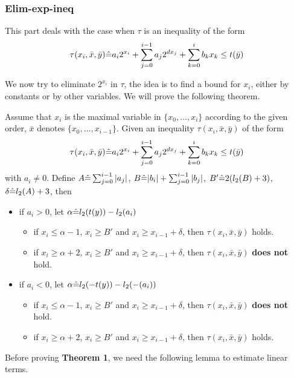 {\subsubsection{Elim-exp-ineq}

This part deals with the case when $\tau$ is an inequality of the form 
$$\tau(x_i,\bar{x},\bar{y}) \hat{=}  a_i 2^{x_i}+\sum_{j=0}^{i-1} a_j2^{d x_j} + \sum_{k=0}^{i}b_k x_k \le t(\bar{y})$$

We now try to eliminate $2^{x_i}$ in $\tau$, the idea is to find a bound for $x_i$, 
either by constants or by other variables.
We will prove the following theorem.

\begin{theorem} \label{thm:exp-ineq}
Assume that $x_i$ is the maximal variable in $\{x_0,...,x_{i}\}$ according to the given order, $\bar{x}$ denotes $\{x_0,...,x_{i-1}\}$.
Given an inequality $\tau(x_i,\bar{x},\bar{y})$ of the form  
$$\tau(x_i,\bar{x},\bar{y}) \hat{=}  a_i 2^{x_i}+\sum_{j=0}^{i-1} a_j2^{d x_j} + \sum_{k=0}^{i}b_k x_k \le t(\bar{y})$$
with $a_i \neq 0$. Define $A\hat{=} \sum_{j=0}^{i-1}|a_j|$, 
$B\hat{=} |b_i| + \sum_{j=0}^{i-1}|b_j|$, 
$B'\hat{=} 2(l_2(B)+3)$,
$\delta\hat{=}  l_2(A)+3$, then 
\begin{itemize}
    \item if $a_i > 0$, let $\alpha \hat{=} l_2(t(y))-l_2(a_i)$
    \begin{itemize}
        \item if $x_i \le \alpha -1$, $x_i \ge B'$ and $x_{i} \ge x_{i-1} +\delta $, then $\tau(x_i,\bar{x},\bar{y})$ holds.
        \item if $x_i \ge \alpha +2$, $x_i \ge B'$ and $x_{i} \ge x_{i-1} +\delta $, then $\tau(x_i,\bar{x},\bar{y})$ \textbf{does not} hold.
    \end{itemize}
    \item if $a_i < 0$, let $\alpha \hat{=} l_2(-t(y))-l_2(-(a_i))$
    \begin{itemize}
        \item if $x_i \le \alpha -1$, $x_i \ge B'$ and $x_{i} \ge x_{i-1} +\delta $, then $\tau(x_i,\bar{x},\bar{y})$ \textbf{does not} hold.
        \item if $x_i \ge \alpha +2$, $x_i \ge B'$ and $x_{i} \ge x_{i-1} +\delta $, then $\tau(x_i,\bar{x},\bar{y})$ holds.
    \end{itemize}
\end{itemize}
\end{theorem}

Before proving \textbf{Theorem 1}, we need  the following lemma to estimate linear terms.

}
